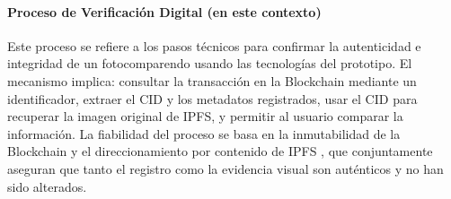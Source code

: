 \paragraph{Proceso de Verificación Digital (en este contexto)}  
Este proceso se refiere a los pasos técnicos para confirmar la autenticidad e integridad de un fotocomparendo usando las tecnologías del prototipo. El mecanismo implica: consultar la transacción en la Blockchain mediante un identificador, extraer el CID y los metadatos registrados, usar el CID para recuperar la imagen original de IPFS, y permitir al usuario comparar la información. La fiabilidad del proceso se basa en la inmutabilidad de la Blockchain \parencite{nakamoto2008bitcoin} y el direccionamiento por contenido de IPFS \parencite{benet2014ipfs}, que conjuntamente aseguran que tanto el registro como la evidencia visual son auténticos y no han sido alterados. 